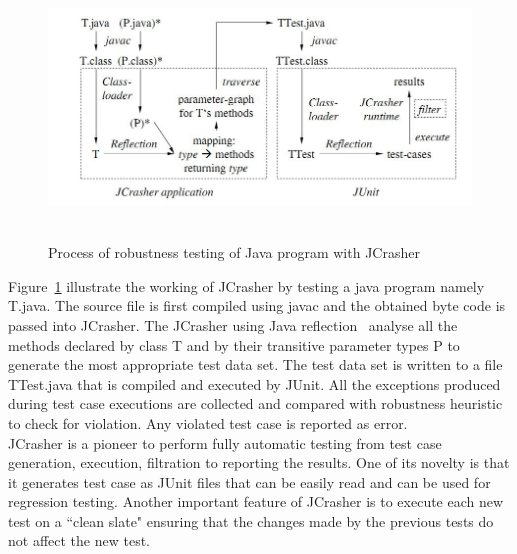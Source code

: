 {\begin{figure}[h]
	\centering
	\includegraphics[width=15cm, height=7cm]{Literature/JCrasher.png}
	\caption{Process of robustness testing of Java program with JCrasher~\cite{Pacheco2007b}}
	\label{fig:JCrasher}
\end{figure}

Figure~\ref{fig:JCrasher} illustrate the working of JCrasher by testing a java program namely T.java. The source file is first compiled using javac and the obtained byte code is passed into JCrasher. The JCrasher using Java reflection~\cite{chan1999java}  analyse all the methods declared by class T and by their transitive parameter types P to generate the most appropriate test data set. The test data set is written to a file TTest.java that is compiled and executed by JUnit. All the exceptions produced during test case executions are collected and compared with robustness heuristic to check for violation. Any violated test case is reported as error.\\

JCrasher is a pioneer to perform fully automatic testing from test case generation, execution, filtration to reporting the results. One of its novelty  is that it generates test case as JUnit files that can be easily read and can be used for regression testing. Another important feature of JCrasher is to execute each new test on a ``clean slate" ensuring that the changes made by the previous tests do not affect the new test.  



}
